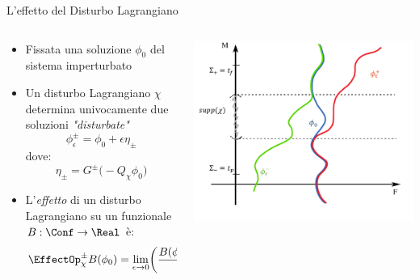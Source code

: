 \documentclass[8pt,handout]{beamer}
\begin{document}
		\begin{frame}{L'effetto del Disturbo Lagrangiano}
		  	\begin{columns}[T]
    			\begin{column}{.5\textwidth}
						\begin{itemize}
							\item Fissata una soluzione $\phi_0$ del sistema imperturbato 
							\item Un disturbo Lagrangiano $\chi$ determina univocamente due soluzioni \emph{"disturbate"}
								\begin{displaymath}
									\phi^\pm_\epsilon = \phi_0 + \epsilon \eta_\pm
								\end{displaymath}
								dove:
								 \begin{displaymath}
   									\eta_\pm = G^\pm \big( - Q_\chi \phi_0 \big)
   								\end{displaymath}
   						\item L'\emph{effetto} di un disturbo Lagrangiano su un funzionale $B:\Conf\rightarrow \Real$ è:
   							\begin{displaymath}		
								\EffectOp_\chi^\pm B ( \phi_0) 
								= \lim_{\epsilon \rightarrow 0}
								 \biggr( \frac{B(\phi_\epsilon^\pm) - B (\phi_0)}{\epsilon} \biggr)
   							\end{displaymath}			
						\end{itemize}
    			\end{column}
    		   	\begin{column}{.5\textwidth}
					\parbox[c][.7\textheight][c]{\columnwidth}{%
							\includegraphics[width=\textwidth]{Pic/AdvRetSol(pezzotta)}
					}
    			\end{column}
    		\end{columns}
	\end{frame}
\end{document}
